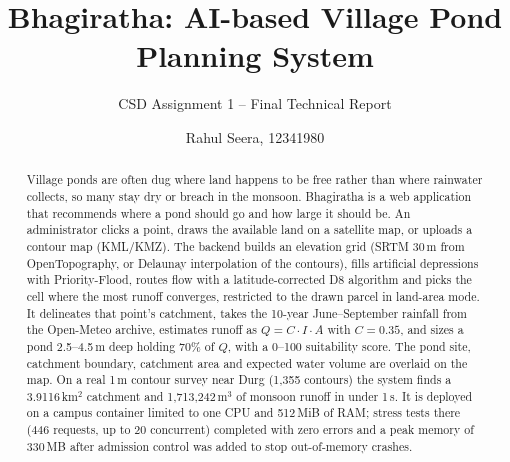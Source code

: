 \documentclass[manuscript,screen,review]{acmart}
\begin{document}
\title{Bhagiratha: AI-based Village Pond Planning System}
\subtitle{CSD Assignment 1 -- Final Technical Report}

\author{Rahul Seera, 12341980}

\renewcommand{\shortauthors}{Seera}
\authorsaddresses{} %

\begin{abstract}
Village ponds are often dug where land happens to be free rather than where rainwater collects, so many stay dry or breach in the monsoon. Bhagiratha is a web application that recommends where a pond should go and how large it should be. An administrator clicks a point, draws the available land on a satellite map, or uploads a contour map (KML/KMZ). The backend builds an elevation grid (SRTM 30\,m from OpenTopography, or Delaunay interpolation of the contours), fills artificial depressions with Priority-Flood, routes flow with a latitude-corrected D8 algorithm and picks the cell where the most runoff converges, restricted to the drawn parcel in land-area mode. It delineates that point's catchment, takes the 10-year June--September rainfall from the Open-Meteo archive, estimates runoff as $Q = C\cdot I\cdot A$ with $C=0.35$, and sizes a pond 2.5--4.5\,m deep holding 70\% of $Q$, with a 0--100 suitability score. The pond site, catchment boundary, catchment area and expected water volume are overlaid on the map. On a real 1\,m contour survey near Durg (1,355 contours) the system finds a 3.9116\,km$^2$ catchment and 1,713,242\,m$^3$ of monsoon runoff in under 1\,s. It is deployed on a campus container limited to one CPU and 512\,MiB of RAM; stress tests there (446 requests, up to 20 concurrent) completed with zero errors and a peak memory of 330\,MB after admission control was added to stop out-of-memory crashes.
\end{abstract}


\maketitle
\end{document}
